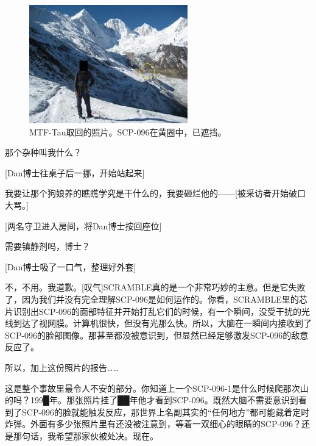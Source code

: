 \begin{figure}[H]
    \centering
    \includegraphics[width=0.5\linewidth]{images/incident-096-1-a.jpg}
    \caption*{MTF-Tau取回的照片。SCP-096在黄圈中，已遮挡。}
\end{figure}

\begin{scpbox}


那个杂种叫我什么？

{[}Dan博士往桌子后一挪，开始站起来]

我要让那个狗娘养的瞧瞧学究是干什么的，我要砸烂他的——{[}被采访者开始破口大骂。]

{[}两名守卫进入房间，将Dan博士按回座位]

需要镇静剂吗，博士？

{[}Dan博士吸了一口气，整理好外套]

不，不用。我道歉。{[}叹气]SCRAMBLE真的是一个非常巧妙的主意。但是它失败了，因为我们并没有完全理解SCP-096是如何运作的。你看，SCRAMBLE里的芯片识别出SCP-096的面部特征并开始打乱它们的时候，有一个瞬间，没受干扰的光线到达了视网膜。计算机很快，但没有光那么快。所以，大脑在一瞬间内接收到了SCP-096的脸部图像。那甚至都没被意识到，但显然已经足够激发SCP-096的敌意反应了。

所以，加上这份照片的报告……

这是整个事故里最令人不安的部分。你知道上一个SCP-096-1是什么时候爬那次山的吗？199█年。那张照片挂了██年他才看到SCP-096。既然大脑不需要意识到看到了SCP-096的脸就能触发反应，那世界上名副其实的“任何地方”都可能藏着定时炸弹。外面有多少张照片里有还没被注意到，等着一双细心的眼睛的SCP-096？还是那句话，我希望那家伙被处决。现在。


\end{scpbox}


